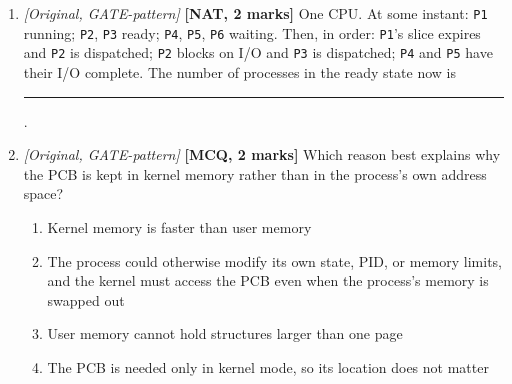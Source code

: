 \documentclass[11pt]{article}
\begin{document}
\begin{enumerate}
\item[\textbf{Q9}] \textit{[Original, GATE-pattern]} \textbf{[NAT, 2 marks]} One CPU. At some instant: \texttt{P1} running; \texttt{P2}, \texttt{P3} ready; \texttt{P4}, \texttt{P5}, \texttt{P6} waiting. Then, in order: \texttt{P1}'s slice expires and \texttt{P2} is dispatched; \texttt{P2} blocks on I/O and \texttt{P3} is dispatched; \texttt{P4} and \texttt{P5} have their I/O complete. The number of processes in the ready state now is \rule{1.5cm}{0.4pt}.

\item[\textbf{Q10}] \textit{[Original, GATE-pattern]} \textbf{[MCQ, 2 marks]} Which reason best explains why the PCB is kept in kernel memory rather than in the process's own address space?
\begin{enumerate}
  \item[(A)] Kernel memory is faster than user memory
  \item[(B)] The process could otherwise modify its own state, PID, or memory limits, and the kernel must access the PCB even when the process's memory is swapped out
  \item[(C)] User memory cannot hold structures larger than one page
  \item[(D)] The PCB is needed only in kernel mode, so its location does not matter
\end{enumerate}
\end{enumerate}
\end{document}
